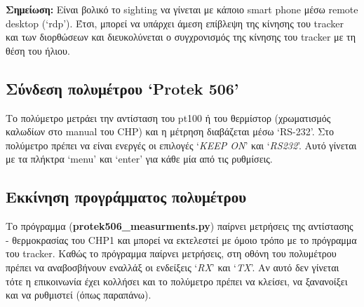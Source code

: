 \documentclass[
  a4paper,
  twoside,
  titlepage,
  11pt]{article}
\numberwithin{equation}{section}
\numberwithin{figure}{section}
\numberwithin{table}{section}
\begin{document}
\textbf{Σημείωση:} Είναι βολικό το sighting να γίνεται με κάποιο smart phone μέσω remote desktop (`rdp').
Έτσι, μπορεί να υπάρχει άμεση επίβλεψη της κίνησης του tracker και των διορθώσεων και διευκολύνεται ο συγχρονισμός της κίνησης του tracker με τη θέση του ήλιου.

\vspace{-1.05\baselineskip}

\hypertarget{ux3c3ux3cdux3bdux3b4ux3b5ux3c3ux3b7-ux3c0ux3bfux3bbux3c5ux3bcux3adux3c4ux3c1ux3bfux3c5-protek-506}{%
\subsection*{Σύνδεση πολυμέτρου `Protek 506'}\label{ux3c3ux3cdux3bdux3b4ux3b5ux3c3ux3b7-ux3c0ux3bfux3bbux3c5ux3bcux3adux3c4ux3c1ux3bfux3c5-protek-506}}

\vspace{-0.6\baselineskip}

Το πολύμετρο μετράει την αντίσταση του pt100 ή του θερμίστορ (χρωματισμός καλωδίων στο manual του CHP) και η μέτρηση διαβάζεται μέσω `RS-232'.
Στο πολύμετρο πρέπει να είναι ενεργές οι επιλογές `\emph{KEEP ON}' και `\emph{RS232}'. Αυτό γίνεται με τα πλήκτρα `menu' και `enter' για κάθε μία από τις ρυθμίσεις.

\vspace{-1.05\baselineskip}

\hypertarget{ux3b5ux3baux3baux3afux3bdux3b7ux3c3ux3b7-ux3c0ux3c1ux3bfux3b3ux3c1ux3acux3bcux3bcux3b1ux3c4ux3bfux3c2-ux3c0ux3bfux3bbux3c5ux3bcux3adux3c4ux3c1ux3bfux3c5}{%
\subsection*{Εκκίνηση προγράμματος πολυμέτρου}\label{ux3b5ux3baux3baux3afux3bdux3b7ux3c3ux3b7-ux3c0ux3c1ux3bfux3b3ux3c1ux3acux3bcux3bcux3b1ux3c4ux3bfux3c2-ux3c0ux3bfux3bbux3c5ux3bcux3adux3c4ux3c1ux3bfux3c5}}

\vspace{-0.6\baselineskip}

Το πρόγραμμα (\textbf{protek506\_measurments.py}) παίρνει μετρήσεις της αντίστασης - θερμοκρασίας του CHP1 και μπορεί να εκτελεστεί με όμοιο τρόπο με το πρόγραμμα του tracker.
Καθώς το πρόγραμμα παίρνει μετρήσεις, στη οθόνη του πολυμέτρου πρέπει να αναβοσβήνουν εναλλάξ οι ενδείξεις `\emph{RX}' και `\emph{TX}'.
Αν αυτό δεν γίνεται τότε η επικοινωνία έχει κολλήσει και το πολύμετρο πρέπει να κλείσει, να ξανανοίξει και να ρυθμιστεί (όπως παραπάνω).
\end{document}

